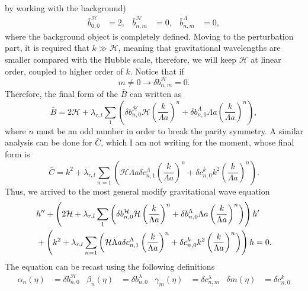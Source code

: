 \documentclass{article}
\begin{document}
by working with the background)
\begin{align}
    \bar{b}^{\mathcal{H}}_{0,0} & = 2, & \bar{b}^{\mathcal{H}}_{n,m} & = 0, & 
    \bar{b}^{\Lambda}_{n,m} & = 0, 
\end{align}
where the background object is completely defined. Moving to the perturbation part, it is required
that $k \gg \mathcal{H}$, meaning that gravitational wavelengths are smaller compared with the Hubble
scale, therefore, we will keep $\mathcal{H}$ at linear order, coupled to higher order of $k$. Notice that
if 
\begin{equation}
    m \neq 0 \to \delta b^{\mathcal{H}}_{n,m} = 0.
\end{equation}
Therefore, the final form of the $\bar{B}$ can written as
\begin{equation}
    \bar{B} = 2\mathcal{H} + \lambda_{r,l}\sum_{1}
    \left(\delta b^{\mathcal{H}}_{n,0}\mathcal{H} \left(\frac{k}{\Lambda a}\right)^n 
    + \delta b^{\Lambda}_{n,0}\Lambda a \left(\frac{k}{\Lambda a}\right)^n\right),
\end{equation}
where $n$ must be an odd number in order to break the parity symmetry. A similar analysis can be done for 
$\bar{C}$, which I am not writing for the moment, whose final form is
\begin{equation}
    \bar{C} = k^2 + \lambda_{r,l} \sum_{n=1}\left(
        \mathcal{H}\Lambda a \delta c^{\Lambda}_{n,1}\left(\frac{k}{\Lambda a}\right)^n
        + \delta c^{k}_{n,0}k^2 \left(\frac{k}{\Lambda a}\right)^n
    \right).
\end{equation}
Thus, we arrived to the most general modify gravitational wave equation 
\begin{align}
    & h'' + \left(2\mathcal{H} + \lambda_{r,l}\sum_{1}
    \left(\delta b^{\mathcal{H}}_{n,0}\mathcal{H} \left(\frac{k}{\Lambda a}\right)^n 
    + \delta b^{\Lambda}_{n,0}\Lambda a \left(\frac{k}{\Lambda a}\right)^n\right)\right)h' \notag \\
    & + \left(k^2 + \lambda_{r,l} \sum_{n=1}\left(
        \mathcal{H}\Lambda a \delta c^{\Lambda}_{n,1}\left(\frac{k}{\Lambda a}\right)^n
        + \delta c^{k}_{n,0}k^2 \left(\frac{k}{\Lambda a}\right)^n\right)\right)h = 0.
\end{align}
The equation can be recast using the following definitions
\begin{align}
    \alpha_{n}\left(\eta\right) & = \delta b^{\mathcal{H}}_{n,0} & 
    \beta_{n}\left(\eta\right) & = \delta b^{\lambda}_{n,0} & 
    \gamma_{m}\left(\eta\right) & = \delta c^{\lambda}_{n,m} & 
    \delta m \left(\eta\right) & = \delta c^{k}_{n,0}
\end{align}
\end{document}
